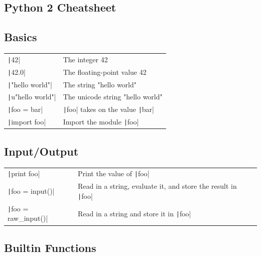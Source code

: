 \documentclass[10pt,a4paper,oneside]{article}
\begin{document}
\begin{landscape}
\begin{multicols}{3}

\section*{Python 2 Cheatsheet}

\renewcommand{\arraystretch}{1.5}

\subsection*{Basics}

\begin{tabular}{lp{5cm}}
\texttt|42| &
{\small The integer 42}\\
%
\texttt|42.0| &
{\small The floating-point value 42}\\
%
\texttt|"hello world"| &
{\small The string "hello world"}\\
%
\texttt|u"hello world"| &
{\small  The unicode string "hello world"}\\
%
\texttt|foo = bar| &
{\small \texttt|foo| takes on the value
  \texttt|bar|}\\
%
\texttt|import foo| &
{\small Import the module \texttt|foo|}
\end{tabular}

\vspace{-0.25cm}
\subsection*{Input/Output}

\begin{tabularx}{6cm}{lL}
\texttt|print foo| &
Print the value of \texttt|foo|\\
%
\texttt|foo = input()| &
Read in a string, evaluate it, and store the result in
\texttt|foo|\\
%
\texttt|foo = raw_input()| &
Read in a string and store it in \texttt|foo|
\end{tabularx}

\vspace{-0.25cm}
\subsection*{Builtin Functions}


\end{multicols}
\end{landscape}
\end{document}
